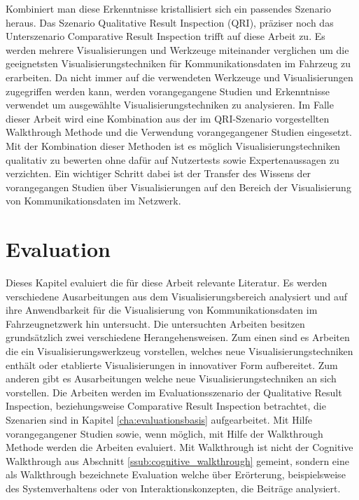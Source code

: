 \documentclass[draft=false
              ,paper=a4
              ,twoside=false
              ,fontsize=11pt
              ,headsepline
              ,BCOR10mm
              ,DIV11
              ]{scrbook}
\begin{document}
Kombiniert man diese Erkenntnisse kristallisiert sich ein passendes Szenario heraus. Das Szenario Qualitative Result Inspection (QRI), präziser noch das Unterszenario Comparative Result Inspection trifft auf diese Arbeit zu. Es werden mehrere Visualisierungen und Werkzeuge miteinander verglichen um die geeignetsten Visualisierungstechniken für Kommunikationsdaten im Fahrzeug zu erarbeiten. Da nicht immer auf die verwendeten Werkzeuge und Visualisierungen zugegriffen werden kann, werden vorangegangene Studien und Erkenntnisse verwendet um ausgewählte Visualisierungstechniken zu analysieren. Im Falle dieser Arbeit wird eine Kombination aus der im QRI-Szenario vorgestellten Walkthrough Methode und die Verwendung vorangegangener Studien eingesetzt. Mit der Kombination dieser Methoden ist es möglich Visualisierungstechniken qualitativ zu bewerten ohne dafür auf Nutzertests sowie Expertenaussagen zu verzichten. Ein wichtiger Schritt dabei ist der Transfer des Wissens der vorangegangen Studien über Visualisierungen auf den Bereich der Visualisierung von Kommunikationsdaten im Netzwerk.

\chapter{Evaluation} %
\label{cha:evaluation}

Dieses Kapitel evaluiert die für diese Arbeit relevante Literatur. Es werden verschiedene Ausarbeitungen aus dem Visualisierungsbereich analysiert und auf ihre Anwendbarkeit für die Visualisierung von Kommunikationsdaten im Fahrzeugnetzwerk hin untersucht. Die untersuchten Arbeiten besitzen grundsätzlich zwei verschiedene Herangehensweisen. Zum einen sind es Arbeiten die ein Visualisierungswerkzeug vorstellen, welches neue Visualisierungstechniken enthält oder etablierte Visualisierungen in innovativer Form aufbereitet. Zum anderen gibt es Ausarbeitungen welche neue Visualisierungstechniken an sich vorstellen. Die Arbeiten werden im Evaluationsszenario der Qualitative Result Inspection, beziehungsweise Comparative Result Inspection betrachtet, die Szenarien sind in Kapitel \ref{cha:evaluationsbasis} aufgearbeitet. Mit Hilfe vorangegangener Studien sowie, wenn möglich, mit Hilfe der Walkthrough Methode werden die Arbeiten evaluiert. Mit Walkthrough ist nicht der Cognitive Walkthrough aus Abschnitt \ref{ssub:cognitive_walkthrough} gemeint, sondern eine als Walkthrough bezeichnete Evaluation welche über Erörterung, beispielsweise des Systemverhaltens oder von Interaktionskonzepten, die Beiträge analysiert.
\end{document}
